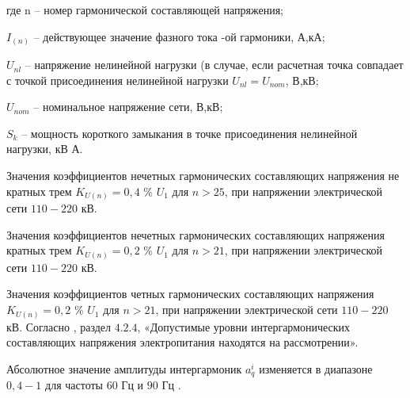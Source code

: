 где n – номер гармонической составляющей напряжения;

$I_{(n)}$ – действующее значение фазного тока -ой гармоники, А,кА;

$U_{nl}$ – напряжение нелинейной нагрузки (в случае, если расчетная точка совпадает с точкой присоединения нелинейной нагрузки $U_{nl} = U_{nom}$, В,кВ;

$U_{nom}$ – номинальное напряжение сети, В,кВ;

$S_k$ – мощность короткого замыкания в точке присоединения нелинейной нагрузки, кВ А.

Значения коэффициентов нечетных гармонических составляющих напряжения не кратных трем $K_{U(n)}=0,4$ \% $U_1$ для $n>25$, при напряжении электрической сети $110-220$ кВ.

Значения коэффициентов нечетных гармонических составляющих напряжения кратных трем $K_{U(n)}=0,2$ \% $U_1$ для $n>21$, при напряжении электрической сети $110-220$ кВ.

Значения коэффициентов четных гармонических составляющих напряжения $K_{U(n)}=0,2$ \% $U_1$ для $n>21$, при напряжении электрической сети $110-220$ кВ.
Согласно \cite{32144-2013}, раздел $4.2.4$, «Допустимые уровни интергармонических составляющих напряжения электропитания находятся на рассмотрении».

Абсолютное значение амплитуды интергармоник $a_q^i$ изменяется в диапазоне $0,4-1$ для частоты $60$ Гц и $90$ Гц \cite{testa2007интергармоники}.

